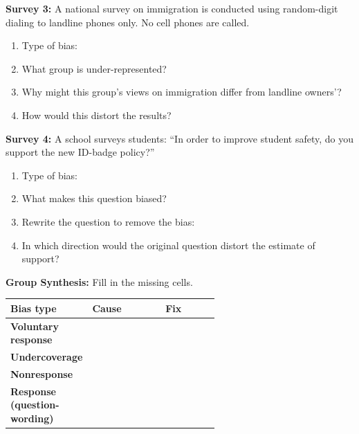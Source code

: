 \documentclass[10pt]{article}
\begin{document}
\vspace{0.1in}

\textbf{Survey 3:} A national survey on immigration is conducted using random-digit
dialing to landline phones only. No cell phones are called.

\begin{practicebox}
\small
\begin{enumerate}[leftmargin=1.5em, itemsep=8pt]
  \item Type of bias: \blank{7cm}
  \item What group is under-represented? \blank{8cm}
  \item Why might this group's views on immigration differ from landline owners'?\\
        \writeline
  \item How would this distort the results? \blank{9cm}
\end{enumerate}
\end{practicebox}

\vspace{0.1in}

\textbf{Survey 4:} A school surveys students: ``In order to improve student safety,
do you support the new ID-badge policy?''

\begin{practicebox}
\small
\begin{enumerate}[leftmargin=1.5em, itemsep=8pt]
  \item Type of bias: \blank{7cm}
  \item What makes this question biased? \blank{9cm}
  \item Rewrite the question to remove the bias: \blank{9cm}
  \item In which direction would the original question distort the estimate of
        support? \blank{7cm}
\end{enumerate}
\end{practicebox}

\vspace{0.12in}

\begin{practicebox}
\small
\textbf{Group Synthesis:} Fill in the missing cells.

\vspace{4pt}
\renewcommand{\arraystretch}{1.7}
\begin{tabularx}{\linewidth}{@{} >{\bfseries}p{0.25\linewidth}
    >{\raggedright\arraybackslash}p{0.35\linewidth}
    >{\raggedright\arraybackslash}X @{}}
\textbf{Bias type} & \textbf{Cause} & \textbf{Fix} \\
\hline
Voluntary response & & \\
Undercoverage & & \\
Nonresponse & & \\
Response (question-wording) & & \\
\end{tabularx}
\end{practicebox}
\end{document}
